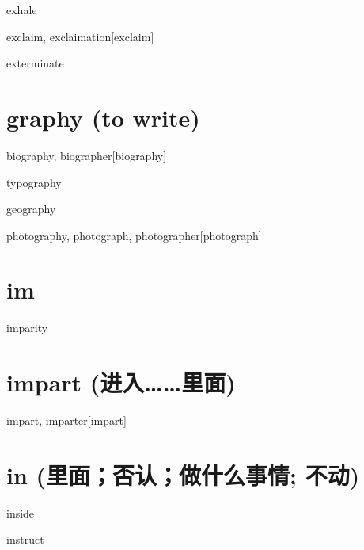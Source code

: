 \begin{RefWord}{exhale}
\end{RefWord}

\begin{RefWord}{exclaim, exclaimation}[exclaim]
\end{RefWord}

\begin{RefWord}{exterminate}
\end{RefWord}

\section{graphy (to write)}

\begin{RefWord}{biography, biographer}[biography]
\end{RefWord}

\begin{RefWord}{typography}
\end{RefWord}

\begin{RefWord}{geography}
\end{RefWord}

\begin{RefWord}{photography, photograph, photographer}[photograph]
\end{RefWord}

\section{im}

\begin{RefWord}{imparity}
\end{RefWord}

\section{impart (进入……里面)}
\begin{RefWord}{impart, imparter}[impart]
\end{RefWord}

\section{in (里面；否认；做什么事情; 不动)}

\begin{RefWord}{inside}
\end{RefWord}

\begin{RefWord}{instruct}
\end{RefWord}

